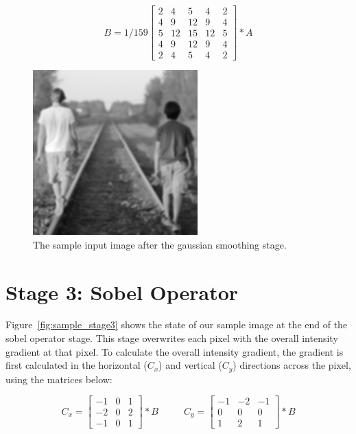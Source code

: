 \documentclass[epsfig,10pt,fullpage]{article}
\begin{document}
\[
B = 1/159
\begin{bmatrix}
    2 & 4 & 5 & 4 & 2 \\
    4 & 9 & 12 & 9 & 4 \\
    5 & 12 & 15 & 12 & 5 \\
    4 & 9 & 12 & 9 & 4 \\
    2 & 4 & 5 & 4 & 2
\end{bmatrix} * A
\]

\begin{figure}[H]
   \begin{center}
       \includegraphics[scale = 0.85]{figures/fig_stage2_gaussian.png}
   \end{center}
   \caption{The sample input image after the gaussian smoothing stage.}
	\label{fig:sample_stage2}
\end{figure}

\noindent
\section*{Stage 3: Sobel Operator} 

Figure~\ref{fig:sample_stage3} shows the state of our sample image at the end of the sobel operator stage. This stage overwrites each pixel with the overall intensity gradient at that pixel. To calculate the overall intensity gradient, the gradient is first calculated in the horizontal ($C_x$) and vertical ($C_y$) directions across the pixel, using the matrices below:

\[
C_x = 
\begin{bmatrix}
    -1 & 0 & 1  \\
    -2 & 0 & 2  \\
    -1 & 0 & 1 
\end{bmatrix} * B
\ \ \ \ \ \ \  \ \ \ \ \  C_y = 
\begin{bmatrix}
    -1 & -2 & -1 \\
    0 & 0 & 0 \\
    1 & 2 & 1
\end{bmatrix} * B
\]
\end{document}
